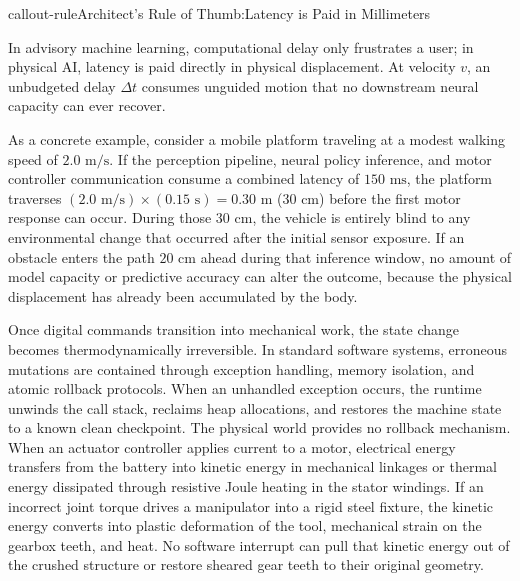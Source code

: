 \documentclass[
  10pt,
  letterpaper,
  twoside,
  openright,
  numbers=noenddot,
  headings=standardclasses
]{scrbook}
\begin{document}
\protect{}\label{callout-ruleux2a-1.4}
\begin{fbxSimple}{callout-rule}{Architect’s Rule of Thumb:}{Latency is Paid in Millimeters}
\label{callout-rule*-1.4}

In advisory machine learning, computational delay only frustrates a
user; in physical AI, latency is paid directly in physical displacement.
At velocity \(v\), an unbudgeted delay \(\Delta t\) consumes unguided
motion that no downstream neural capacity can ever recover.

\end{fbxSimple}

As a concrete example, consider a mobile platform traveling at a modest
walking speed of \(2.0\text{ m/s}\). If the perception pipeline, neural
policy inference, and motor controller communication consume a combined
latency of \(150\text{ ms}\), the platform traverses
\((2.0\text{ m/s}) \times (0.15\text{ s}) = 0.30\text{ m}\)
(\(30\text{ cm}\)) before the first motor response can occur. During
those \(30\text{ cm}\), the vehicle is entirely blind to any
environmental change that occurred after the initial sensor exposure. If
an obstacle enters the path \(20\text{ cm}\) ahead during that inference
window, no amount of model capacity or predictive accuracy can alter the
outcome, because the physical displacement has already been accumulated
by the body.

Once digital commands transition into mechanical work, the state change
becomes thermodynamically irreversible. In standard software systems,
erroneous mutations are contained through exception handling, memory
isolation, and atomic rollback protocols. When an unhandled exception
occurs, the runtime unwinds the call stack, reclaims heap allocations,
and restores the machine state to a known clean checkpoint. The physical
world provides no rollback mechanism. When an actuator controller
applies current to a motor, electrical energy transfers from the battery
into kinetic energy in mechanical linkages or thermal energy dissipated
through resistive Joule heating in the stator windings. If an incorrect
joint torque drives a manipulator into a rigid steel fixture, the
kinetic energy converts into plastic deformation of the tool, mechanical
strain on the gearbox teeth, and heat. No software interrupt can pull
that kinetic energy out of the crushed structure or restore sheared gear
teeth to their original geometry.
\end{document}
